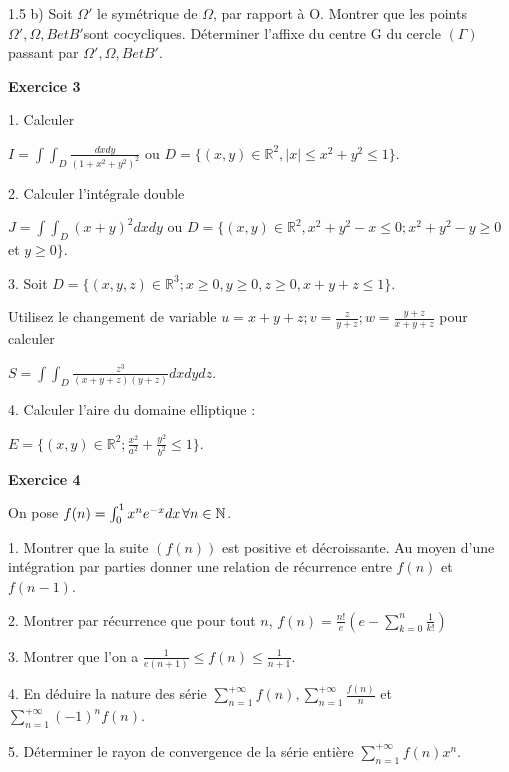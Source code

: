 \documentclass[12pt]{article}
\begin{document}
\begin{spacing}{1.5}
b) Soit $\Omega'$ le symétrique de $\Omega$, par rapport à O. Montrer que les points $\Omega',\Omega,B et B' $sont cocycliques. 
Déterminer l'affixe du centre G du cercle $(\Gamma)$ passant par $\Omega', \Omega, B et B'$. 

\medskip\textbf{Exercice 3 }

1. Calculer

$I=\int\int_D\frac{dxdy}{(1+x^2+y^2)^2}$ ou $D=\lbrace {(x,y) \in \mathbb{R}^2,\vert x\vert \leq x^2+y^2\leq 1\rbrace}$.

2. Calculer l'intégrale double

$J=\int\int_D(x+y)^2dxdy$ ou $D=\lbrace (x,y)\in \mathbb{R}^2, x^2+y^2-x \leq 0;x^2+y^2-y \geq 0$ et $y \geq 0 \rbrace$.

3. Soit $D=\lbrace (x,y,z)\in \mathbb{R}^3;x\geq 0,y\geq 0,z\geq 0,x+y+z\leq 1 \rbrace$.

Utilisez le changement de variable $u=x+y+z; v=\frac{z}{y+z}; w=\frac{y+z}{x+y+z}$ pour calculer

$S=\int\int_D\frac{z^3}{(x+y+z)(y+z)}dxdydz$.

4. Calculer l'aire du domaine elliptique :

$E = \lbrace (x,y)\in \mathbb{R}^2;\frac{x^2}{a^2}+\frac{y^2}{b^2}\leq 1\rbrace$.


\medskip\textbf{Exercice 4 }

On pose $f(n)=\int_{0}^{1}x^ne^{-x}dx \hspace{0.05cm} \forall n\in \mathbb{N}$.

1. Montrer que la suite $(f(n))$ est positive et décroissante. Au moyen d'une intégration par parties
 donner une relation de récurrence entre $f(n)$ et $f(n-1)$.
 
 2. Montrer par récurrence que pour tout $n$,  $f(n)= \frac{n!}{e}(e-\sum_{k=0}^{n}\frac{1}{k!})$
 
 3. Montrer que l'on a $\frac{1}{e(n+1)}\leq f(n)\leq \frac{1}{n+1}$.
 
 4. En déduire la nature des série $\sum_{n=1}^{+\infty}f(n), \sum_{n=1}^{+\infty}\frac{f(n)}{n}$ et $\sum_{n=1}^{+\infty}(-1)^nf(n)$.
 
 5. Déterminer le rayon de convergence de la série entière $\sum_{n=1}^{+\infty}f(n)x^n$.
 
 
 \quad
 \quad
 

\end{spacing}
\end{document}
